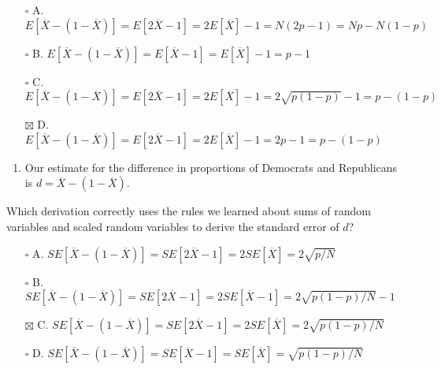 \documentclass[
]{article}
\providecommand{\tightlist}{%
  \setlength{\itemsep}{0pt}\setlength{\parskip}{0pt}}
\begin{document}
\begin{itemize}
\tightlist
\item[$\square$]
  A.
  \(E \left [\overline{X} − (1 − \overline{X}) \right] = E \left [2 \overline{X} − 1 \right] = 2E \left [\overline{X} \right] - 1 = N(2p − 1) = Np − N(1 − p)\)
\item[$\square$]
  B.
  \(E \left [\overline{X} − (1 − \overline{X}) \right] = E \left [\overline{X} − 1 \right] = E \left [\overline{X} \right] − 1 = p − 1\)
\item[$\square$]
  C.
  \(E \left [\overline{X} − (1 − \overline{X}) \right] = E \left [2 \overline{X} − 1 \right] = 2E \left [\overline{X} \right] - 1 = 2 \sqrt{p(1 − p)} − 1 = p − (1 − p)\)
\item[$\boxtimes$]
  D.
  \(E \left [\overline{X} − (1 − \overline{X}) \right] = E \left [2 \overline{X} − 1 \right] = 2E \left [\overline{X} \right] - 1 = 2p − 1 = p − (1 − p)\)
\end{itemize}

\begin{enumerate}
\def\labelenumi{\arabic{enumi}.}
\setcounter{enumi}{7}
\tightlist
\item
  Our estimate for the difference in proportions of Democrats and
  Republicans is \(d = \overline{X} − (1 − \overline{X})\).
\end{enumerate}

Which derivation correctly uses the rules we learned about sums of
random variables and scaled random variables to derive the standard
error of \(d\)?

\begin{itemize}
\tightlist
\item[$\square$]
  A.
  \(SE \left [\overline{X} − (1 − \overline{X}) \right] = SE \left [2 \overline{X} − 1 \right] = 2SE \left [\overline{X} \right] = 2 \sqrt{p/N}\)
\item[$\square$]
  B.
  \(SE \left [\overline{X} − (1 − \overline{X}) \right] = SE \left [2 \overline{X} − 1 \right] = 2SE \left [\overline{X} - 1 \right] = 2 \sqrt{p(1 − p)/N} − 1\)
\item[$\boxtimes$]
  C.
  \(SE \left [\overline{X} − (1 − \overline{X}) \right] = SE \left [2 \overline{X} − 1 \right] = 2SE \left [\overline{X} \right] = 2 \sqrt{p(1 − p)/N}\)
\item[$\square$]
  D.
  \(SE \left [\overline{X} − (1 − \overline{X}) \right] = SE \left [\overline{X} − 1 \right] = SE\left [\overline{X} \right] = \sqrt{p(1 − p)/N}\)
\end{itemize}
\end{document}
